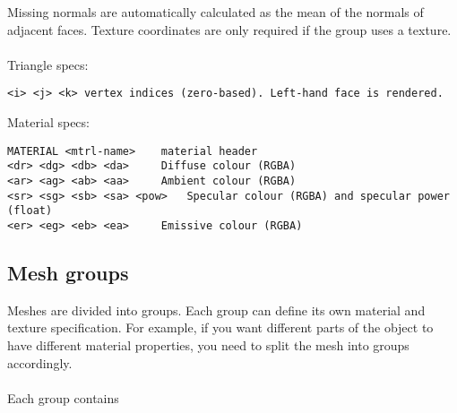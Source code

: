 \documentclass[Orbiter Developer Manual.tex]{subfiles}
\begin{document}
\noindent
Missing normals are automatically calculated as the mean of the normals of adjacent faces. Texture coordinates are only required if the group uses a texture.\\
\\
Triangle specs:

\begin{lstlisting}
<i> <j> <k>	vertex indices (zero-based). Left-hand face is rendered.
\end{lstlisting}

\noindent
Material specs:

\begin{lstlisting}
MATERIAL <mtrl-name>	material header
<dr> <dg> <db> <da>		Diffuse colour (RGBA)
<ar> <ag> <ab> <aa>		Ambient colour (RGBA)
<sr> <sg> <sb> <sa> <pow>	Specular colour (RGBA) and specular power (float)
<er> <eg> <eb> <ea>		Emissive colour (RGBA)
\end{lstlisting}


\subsection{Mesh groups}
Meshes are divided into groups. Each group can define its own material and texture specification. For example, if you want different parts of the object to have different material properties, you need to split the mesh into groups accordingly.\\
\\
Each group contains
\end{document}
